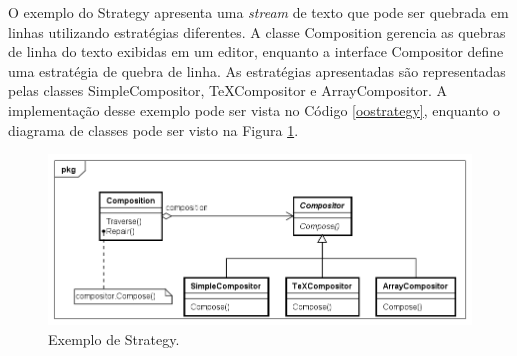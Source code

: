 O exemplo do Strategy apresenta uma \textit{stream} 
de texto que pode ser quebrada em linhas utilizando 
estratégias diferentes. A classe Composition 
gerencia as quebras de linha do texto exibidas em 
um editor, enquanto a interface Compositor define 
uma estratégia de quebra de linha. As estratégias 
apresentadas são representadas pelas classes 
SimpleCompositor, TeXCompositor e ArrayCompositor. 
A implementação desse exemplo pode ser vista no Código 
\ref{oostrategy}, enquanto o diagrama de classes pode 
ser visto na Figura \ref{strategy_exemplo}.

\begin{figure}[htb]
	\caption{\label{strategy_exemplo}Exemplo de Strategy.}
	\begin{center}
	    \includegraphics[scale=0.5]{5_padroes-contexto-funcional/5.3_comportamentais/5.3.09_strategy/strategy_exemplo.png}
	\end{center}
\end{figure}


